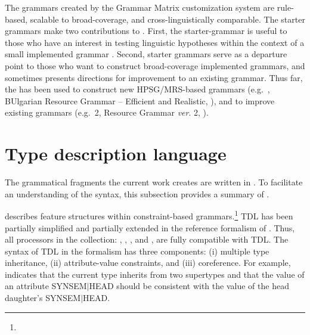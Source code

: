 




The grammars created by the \lingo Grammar Matrix customization system
are rule-based, scalable to broad-coverage, and cross-linguistically
comparable.  The starter grammars make two contributions to
. First, the starter-grammar is useful to
those who have an interest in testing linguistic hypotheses within the
context of a small implemented grammar \citep{bender:etal:11b}.
Second, starter grammars serve as a departure point to those who want
to construct broad-coverage implemented grammars, and sometimes
presents directions for improvement to an existing grammar. Thus far,
the \lingo {} has been used to construct new
HPSG/MRS-based grammars (e.g.\ , BUlgarian Resource
Grammar -- Efficient and Realistic, \citealt{osenova:11}),
and to improve existing grammars (e.g.\ 2, 
Resource Grammar \textit{ver}. 2, \citealt{song:etal:10}).




\section{Type description language}
\label{2:sec:tdl}

The grammatical fragments the current work creates are written in
.  To facilitate an understanding of the syntax, this
subsection provides a summary of .



 describes feature structures within constraint-based
grammars.\footnote{}
TDL has been partially simplified and partially extended in the
reference formalism of . Thus, all processors in the
 collection: \isi{\lkb}, \isi{\pet}, \isi{\ace}, and
\isi{\agree}, are fully compatible with TDL. The syntax of TDL in the
 formalism has three components: (i) multiple type
inheritance, (ii) attribute-value constraints, and (iii)
coreference. For example,  indicates that the
current type inherits from two supertypes and that the value of an
attribute SYNSEM{$\mid$}HEAD should be consistent with the value of
the head daughter's SYNSEM{$\mid$}HEAD.

